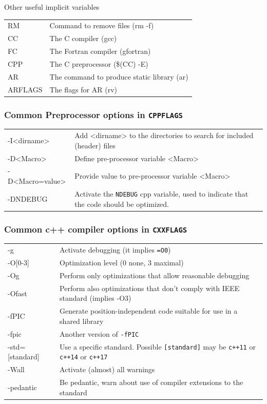 \documentclass[10pt,aspectratio=169]{beamer}
\begin{document}
\begin{frame}{Other useful implicit variables}

  \begin{tabular}{>{\ttfamily}l|l}
RM & Command to remove files (rm -f)\\
CC & The C compiler (gcc)\\
    FC & The Fortran compiler (gfortran)\\
    CPP & The C preprocessor (\$(CC) -E)\\
    AR  & The command to produce static library (ar)\\
    ARFLAGS & The flags for AR (rv)
\end{tabular}
\end{frame}

\begin{frame}
  \frametitle{Common Preprocessor options in \texttt{CPPFLAGS}}
 \hspace*{-0.5cm}
  \begin{tabular}{>{\ttfamily}l|p{}}
    -I<dirname> & Add <dirname> to the directories to search for included (header) files\\
    -D<Macro> & Define pre-processor variable <Macro>\\
    -D<Macro=value> & Provide value to pre-processor variable <Macro>\\
    -DNDEBUG & Activate the \texttt{NDEBUG} cpp variable, used
               to indicate that the code should be optimized.
  \end{tabular}  
\end{frame}

\begin{frame}
  \frametitle{Common c++ compiler options in \texttt{CXXFLAGS}}
 \hspace*{-0.5cm}
  \begin{tabular}{>{\ttfamily}l|p{}}
    -g & Activate debugging (it implies \texttt{=O0})\\
    -O[0-3]& Optimization level (0 none, 3 maximal)\\
    -Og & Perform only optimizations that allow reasonable debugging\\
    -Ofast & Perform also optimizations that don't comply with IEEE standard
    (implies -O3)\\
    -fPIC &  Generate position-independent code suitable for use in a
            shared library\\
    -fpic & Another version of \texttt{-fPIC}\\
    -std=[standard] & Use a specific standard. Possible
                      \texttt{[standard]} may be
                      \texttt{c++11} or \texttt{c++14} or \texttt{c++17}\\
    -Wall & Activate (almost) all warnings\\
    -pedantic & Be pedantic, warn about use of  compiler extensions to the
                standard\\
  \end{tabular}  
\end{frame}
\end{document}
